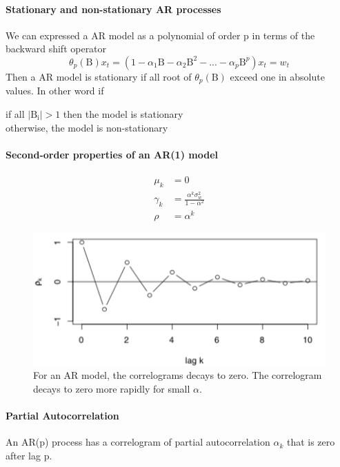 \paragraph{Stationary and non-stationary AR processes}
We can expressed a AR model as a polynomial of order p in terms of the backward shift operator
\[ \theta_p(\mathrm{B})x_t = (1 - \alpha_1\mathrm{B} - \alpha_2 \mathrm{B}^2 - ... - \alpha_p \mathrm{B}^p)x_t = w_t \]
Then a AR model is stationary if all root of $\theta_p(\mathrm{B})$ exceed one in absolute values. In other word if 
\begin{center}
if all $|\mathrm{B_i}| > 1$ then the model is stationary \\
otherwise, the model is non-stationary
\end{center}

\paragraph{Second-order properties of an AR(1) model}
    \begin{align*}
      \mu_k &= 0 \\  
      \gamma_k &= \frac{\alpha^k \sigma_w^2}{1 - \alpha^2} \\
      \rho &= \alpha^k
\end{align*}

\begin{figure}[!ht]
    \centering
    \includegraphics[scale=0.7]{src/SerieChronologique/AR-Correlogram.png}
    \caption{For an AR model, the correlograms decays to zero. The correlogram decays to zero more rapidly for small $\alpha$.}
\end{figure}

\paragraph{Partial Autocorrelation}
An AR(p) process has a correlogram of partial autocorrelation $\alpha_k$ that is zero after lag p.

